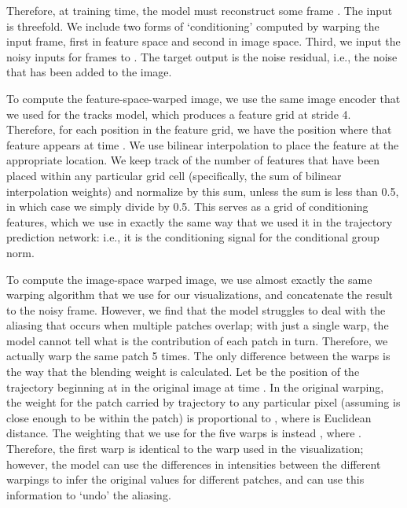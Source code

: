 \documentclass[10pt,twocolumn,letterpaper]{article}
\begin{document}
Therefore, at training time, the model must reconstruct some frame .  The input is threefold.  We include two forms of `conditioning' computed by warping the input frame, first in feature space and second in image space.  Third, we input the noisy inputs for frames  to .  The target output is the noise residual, i.e., the noise that has been added to the image.

To compute the feature-space-warped image, we use the same image encoder that we used for the tracks model, which produces a feature grid at stride 4.  Therefore, for each position in the feature grid, we have the position where that feature appears at time .  We use bilinear interpolation to place the feature at the appropriate location.  We keep track of the number of features that have been placed within any particular grid cell (specifically, the sum of bilinear interpolation weights) and normalize by this sum, unless the sum is less than 0.5, in which case we simply divide by 0.5.  This serves as a grid of conditioning features, which we use in exactly the same way that we used it in the trajectory prediction network: i.e., it is the conditioning signal for the conditional group norm.

To compute the image-space warped image, we use almost exactly the same warping algorithm that we use for our visualizations, and concatenate the result to the noisy frame.  However, we find that the model struggles to deal with the aliasing that occurs when multiple patches overlap; with just a single warp, the model cannot tell what is the contribution of each patch in turn.  Therefore, we actually warp the same patch 5 times.  The only difference between the warps is the way that the blending weight is calculated.  Let  be the position of the trajectory beginning at  in the original image at time .  In the original warping, the weight for the patch carried by trajectory to any particular pixel  (assuming  is close enough to be within the patch) is proportional to , where  is Euclidean distance.  The weighting that we use for the five warps is instead , where .  Therefore, the first warp is identical to the warp used in the visualization; however, the model can use the differences in intensities between the different warpings to infer the original values for different patches, and can use this information to `undo' the aliasing.
\end{document}
